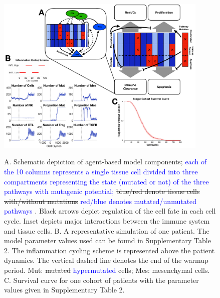 \documentclass[11pt]{article}
\newcommand{\tcr} { \textcolor{red} }
\newcommand{\tcb} { \textcolor{blue} }
\begin{document}
\begin{figure}
\center
{\includegraphics[width=0.9\textwidth]{Figure1/Figure1.pdf}}
\caption{A. Schematic depiction of agent-based model components; \tcb{
each of the 10 columns represents a single tissue cell divided into three compartments representing the state (mutated or not) of the three pathways with mutagenic potential;
}\sout{blue/red denote tissue cells with/without mutations} \tcb{red/blue denotes mutated/unmutated pathways} . Black arrows depict regulation of the cell fate in each cell cycle. Inset depicts major interactions between the immune system and tissue cells.
B. A representative simulation of one patient. The model parameter values used can be found in Supplementary Table 2. 
The inflammation cycling scheme is represented above the patient dynamics. The vertical dashed line denotes the end of the warmup period. Mut: \sout{mutated} \tcb{hypermutated} cells; Mes: mesenchymal cells. 
C. Survival curve for one cohort of patients with the parameter values given in Supplementary Table 2. }
\label{fig:ModelIntro}
\end{figure}
\end{document}
